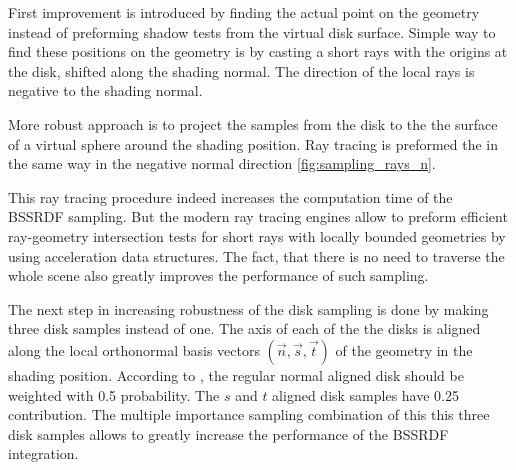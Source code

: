 First improvement is introduced by finding the actual point on the geometry instead of preforming
shadow tests from the virtual disk surface. Simple way to find these positions on the geometry is by
casting a short rays with the origins at the disk, shifted along the shading normal.
The direction of the local rays is negative to the shading normal.

More robust approach is to project the samples from the disk to the the surface of a virtual sphere
around the shading position. Ray tracing is preformed the in the same way in the negative normal
direction \ref{fig:sampling_rays_n}.

This ray tracing procedure indeed increases the computation time of the BSSRDF sampling. But the
modern ray tracing engines allow to preform efficient ray-geometry intersection tests for short rays
with locally bounded geometries by using acceleration data structures. The fact, that there is no
need to traverse the whole scene also greatly improves the performance of such sampling.

The next step in increasing robustness of the disk sampling is done by making three disk samples
instead of one. The axis of each of the the disks is aligned along the local orthonormal basis
vectors $(\vec{n},\vec{s},\vec{t})$ of the geometry in the shading position.
According to \cite{King:2013:BIS:2504459.2504520}, the regular normal aligned disk should be
weighted with 0.5 probability. The $s$ and $t$ aligned disk samples have 0.25 contribution. The
multiple importance sampling combination of this this three disk samples allows to greatly increase
the performance of the BSSRDF integration.